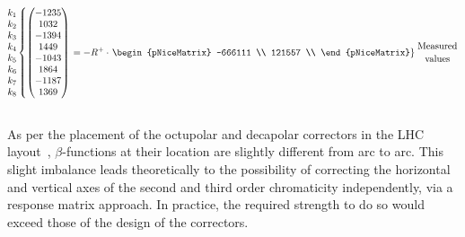 \begin{equation}
    \begin{matrix}
      k_1 \\
      k_2 \\
      k_3 \\
      k_4 \\
      k_5 \\
      k_6 \\
      k_7 \\
      k_8 \\
    \end{matrix}
  \left\{
  \begin{pmatrix}
     -1235 \\
      1032   \\  
     -1394  \\ 
      1449   \\ 
     -1043  \\ 
      1864   \\ 
     -1187  \\ 
      1369   \\ 
  \end{pmatrix}
  \right.
  =
  -R^{+} 
  \cdot
  \left.
  \begin{pNiceMatrix}
      -666111 \\
      121557 \\
  \end{pNiceMatrix}
  \right\}
  {\genfrac{}{}{0pt}{0}{\text{Measured}}{\text{values}}}
  \label{eq:resp_matrix_inverse_example}
\end{equation}





\subsection{}
\label{subsection:correction_chromaticity}


As per the placement of the octupolar and decapolar correctors in the LHC 
layout~\cite{maclean_commissioning_2016-1}, $\beta$-functions at their location are slightly
different from arc to arc. This slight imbalance leads theoretically to the possibility of
correcting the horizontal and vertical axes of the second and third order chromaticity
independently, via a response matrix approach. In practice, the required strength to do so would
exceed those of the design of the correctors.

